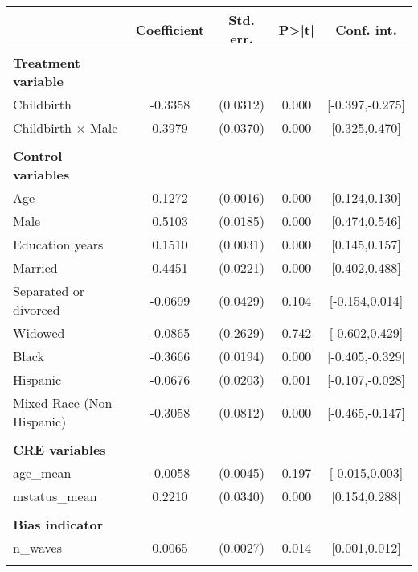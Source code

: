 {
\def\sym#1{\ifmmode^{#1}\else\(^{#1}\)\fi}
\begin{tabular}{l*{1}{cccc}}
\toprule
                    & Coefficient&   Std. err.&       P>|t|&  Conf. int.\\
\midrule
\textbf{Treatment variable}&            &            &            &            \\
Childbirth          &     -0.3358&    (0.0312)&       0.000&[-0.397,-0.275]\\
Childbirth $\times$ Male&      0.3979&    (0.0370)&       0.000&[0.325,0.470]\\
\\ \textbf{Control variables}&            &            &            &            \\
Age                 &      0.1272&    (0.0016)&       0.000&[0.124,0.130]\\
Male                &      0.5103&    (0.0185)&       0.000&[0.474,0.546]\\
Education years     &      0.1510&    (0.0031)&       0.000&[0.145,0.157]\\
Married             &      0.4451&    (0.0221)&       0.000&[0.402,0.488]\\
Separated or divorced&     -0.0699&    (0.0429)&       0.104&[-0.154,0.014]\\
Widowed             &     -0.0865&    (0.2629)&       0.742&[-0.602,0.429]\\
Black               &     -0.3666&    (0.0194)&       0.000&[-0.405,-0.329]\\
Hispanic            &     -0.0676&    (0.0203)&       0.001&[-0.107,-0.028]\\
Mixed Race (Non-Hispanic)&     -0.3058&    (0.0812)&       0.000&[-0.465,-0.147]\\
\\ \textbf{CRE variables}&            &            &            &            \\
age\_mean            &     -0.0058&    (0.0045)&       0.197&[-0.015,0.003]\\
mstatus\_mean        &      0.2210&    (0.0340)&       0.000&[0.154,0.288]\\
\\ \textbf{Bias indicator}&            &            &            &            \\
n\_waves             &      0.0065&    (0.0027)&       0.014&[0.001,0.012]\\
                    &            &            &            &            \\

\end{tabular}}
